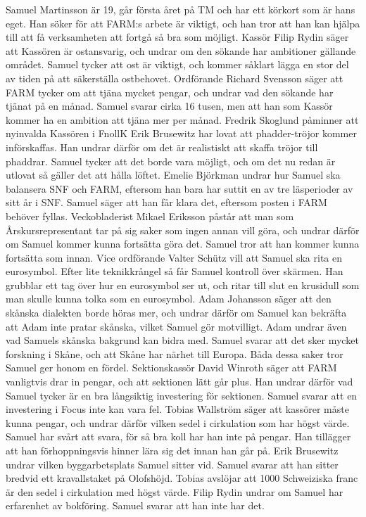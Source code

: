\documentclass[hidelinks]{sektionsmote} %
\begin{document}
Samuel Martinsson är 19, går första året på TM och har ett körkort som är hans eget.
Han söker för att FARM:s arbete är viktigt, och han tror att han kan hjälpa till att få verksamheten att fortgå så bra som möjligt.
Kassör Filip Rydin säger att Kassören är ostansvarig, och undrar om den sökande har ambitioner gällande området.
Samuel tycker att ost är viktigt, och kommer såklart lägga en stor del av tiden på att säkerställa ostbehovet.
Ordförande Richard Svensson säger att FARM tycker om att tjäna mycket pengar, och undrar vad den sökande har tjänat på en månad.
Samuel svarar cirka 16 tusen, men att han som Kassör kommer ha en ambition att tjäna mer per månad.
Fredrik Skoglund påminner att nyinvalda Kassören i FnollK Erik Brusewitz har lovat att phadder-tröjor kommer införskaffas.
Han undrar därför om det är realistiskt att skaffa tröjor till phaddrar.
Samuel tycker att det borde vara möjligt, och om det nu redan är utlovat så gäller det att hålla löftet.
Emelie Björkman undrar hur Samuel ska balansera SNF och FARM, eftersom han bara har suttit en av tre läsperioder av sitt år i SNF.
Samuel säger att han får klara det, eftersom posten i FARM behöver fyllas.
Veckobladerist Mikael Eriksson påstår att man som Årskursrepresentant tar på sig saker som ingen annan vill göra, och undrar därför om Samuel kommer kunna fortsätta göra det.
Samuel tror att han kommer kunna fortsätta som innan.
Vice ordförande Valter Schütz vill att Samuel ska rita en eurosymbol.
Efter lite teknikkrångel så får Samuel kontroll över skärmen.
Han grubblar ett tag över hur en eurosymbol ser ut, och ritar till slut en krusidull som man skulle kunna tolka som en eurosymbol.
Adam Johansson säger att den skånska dialekten borde höras mer, och undrar därför om Samuel kan bekräfta att Adam inte pratar skånska, vilket Samuel gör motvilligt.
Adam undrar även vad Samuels skånska bakgrund kan bidra med.
Samuel svarar att det sker mycket forskning i Skåne, och att Skåne har närhet till Europa.
Båda dessa saker tror Samuel ger honom en fördel.
Sektionskassör David Winroth säger att FARM vanligtvis drar in pengar, och att sektionen lätt går plus.
Han undrar därför vad Samuel tycker är en bra långsiktig investering för sektionen.
Samuel svarar att en investering i Focus inte kan vara fel.
Tobias Wallström säger att kassörer måste kunna pengar, och undrar därför vilken sedel i cirkulation som har högst värde.
Samuel har svårt att svara, för så bra koll har han inte på pengar.
Han tillägger att han förhoppningsvis hinner lära sig det innan han går på.
Erik Brusewitz undrar vilken byggarbetsplats Samuel sitter vid.
Samuel svarar att han sitter bredvid ett kravallstaket på Olofshöjd.
Tobias avslöjar att 1000 Schweiziska franc är den sedel i cirkulation med högst värde.
Filip Rydin undrar om Samuel har erfarenhet av bokföring.
Samuel svarar att han inte har det.
\end{document}
